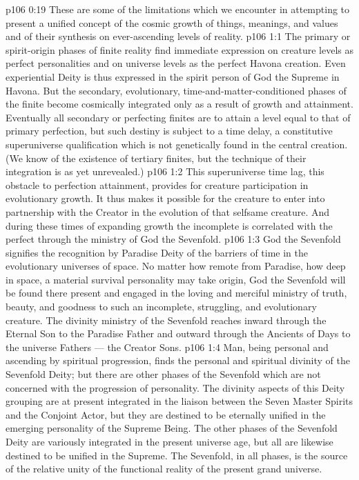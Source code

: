 \vs p106 0:19 \pc These are some of the limitations which we encounter in attempting to present a unified concept of the cosmic growth of things, meanings, and values and of their synthesis on ever\hyp{}ascending levels of reality.
\vs p106 1:1 The primary or spirit\hyp{}origin phases of finite reality find immediate expression on creature levels as perfect personalities and on universe levels as the perfect Havona creation. Even experiential Deity is thus expressed in the spirit person of God the Supreme in Havona. But the secondary, evolutionary, time\hyp{}and\hyp{}matter\hyp{}conditioned phases of the finite become cosmically integrated only as a result of growth and attainment. Eventually all secondary or perfecting finites are to attain a level equal to that of primary perfection, but such destiny is subject to a time delay, a constitutive superuniverse qualification which is not genetically found in the central creation. (We know of the existence of tertiary finites, but the technique of their integration is as yet unrevealed.)
\vs p106 1:2 This superuniverse time lag, this obstacle to perfection attainment, provides for creature participation in evolutionary growth. It thus makes it possible for the creature to enter into partnership with the Creator in the evolution of that selfsame creature. And during these times of expanding growth the incomplete is correlated with the perfect through the ministry of God the Sevenfold.
\vs p106 1:3 God the Sevenfold signifies the recognition by Paradise Deity of the barriers of time in the evolutionary universes of space. No matter how remote from Paradise, how deep in space, a material survival personality may take origin, God the Sevenfold will be found there present and engaged in the loving and merciful ministry of truth, beauty, and goodness to such an incomplete, struggling, and evolutionary creature. The divinity ministry of the Sevenfold reaches inward through the Eternal Son to the Paradise Father and outward through the Ancients of Days to the universe Fathers --- the Creator Sons.
\vs p106 1:4 Man, being personal and ascending by spiritual progression, finds the personal and spiritual divinity of the Sevenfold Deity; but there are other phases of the Sevenfold which are not concerned with the progression of personality. The divinity aspects of this Deity grouping are at present integrated in the liaison between the Seven Master Spirits and the Conjoint Actor, but they are destined to be eternally unified in the emerging personality of the Supreme Being. The other phases of the Sevenfold Deity are variously integrated in the present universe age, but all are likewise destined to be unified in the Supreme. The Sevenfold, in all phases, is the source of the relative unity of the functional reality of the present grand universe.
